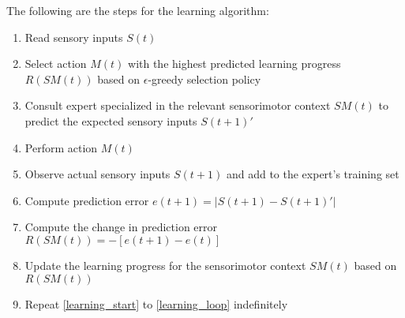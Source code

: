 The following are the steps for the learning algorithm:

\begin{enumerate}
	\item \label{learning_start} Read sensory inputs $S(t)$
	\item Select action $M(t)$ with the highest predicted learning progress $R(SM(t))$ based on $\epsilon$-greedy selection policy
	\item Consult expert specialized in the relevant sensorimotor context $SM(t)$ to predict the expected sensory inputs $S(t+1)'$
	\item Perform action $M(t)$
	\item Observe actual sensory inputs $S(t+1)$ and add to the expert's training set
	\item Compute prediction error $e(t+1) = |S(t+1) - S(t+1)'|$
	\item Compute the change in prediction error $R(SM(t)) = -[e(t+1) - e(t)]$
	\item Update the learning progress for the sensorimotor context $SM(t)$ based on $R(SM(t))$
	\item \label{learning_loop} Repeat \ref{learning_start} to \ref{learning_loop} indefinitely
\end{enumerate}

